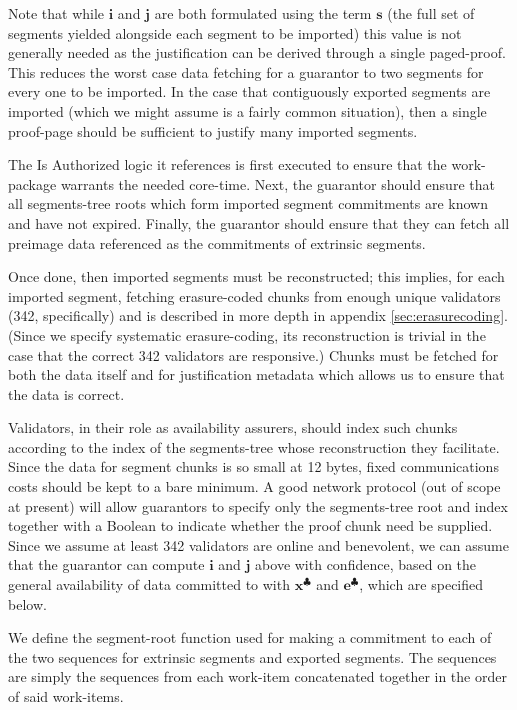 Note that while $\mathbf{i}$ and $\mathbf{j}$ are both formulated using the term $\mathbf{s}$ (the full set of segments yielded alongside each segment to be imported) this value is not generally needed as the justification can be derived through a single paged-proof. This reduces the worst case data fetching for a guarantor to two segments for every one to be imported. In the case that contiguously exported segments are imported (which we might assume is a fairly common situation), then a single proof-page should be sufficient to justify many imported segments.

The Is Authorized logic it references is first executed to ensure that the work-package warrants the needed core-time. Next, the guarantor should ensure that all segments-tree roots which form imported segment commitments are known and have not expired. Finally, the guarantor should ensure that they can fetch all preimage data referenced as the commitments of extrinsic segments.

Once done, then imported segments must be reconstructed; this implies, for each imported segment, fetching erasure-coded chunks from enough unique validators (342, specifically) and is described in more depth in appendix \ref{sec:erasurecoding}. (Since we specify systematic erasure-coding, its reconstruction is trivial in the case that the correct 342 validators are responsive.) Chunks must be fetched for both the data itself and for justification metadata which allows us to ensure that the data is correct.

Validators, in their role as availability assurers, should index such chunks according to the index of the segments-tree whose reconstruction they facilitate. Since the data for segment chunks is so small at 12 bytes, fixed communications costs should be kept to a bare minimum. A good network protocol (out of scope at present) will allow guarantors to specify only the segments-tree root and index together with a Boolean to indicate whether the proof chunk need be supplied. Since we assume at least 342 validators are online and benevolent, we can assume that the guarantor can compute $\mathbf{i}$ and $\mathbf{j}$ above with confidence, based on the general availability of data committed to with $\mathbf{x}^\clubsuit$ and $\mathbf{e}^\clubsuit$, which are specified below.


We define the segment-root function used for making a commitment to each of the two sequences for extrinsic segments and exported segments. The sequences are simply the sequences from each work-item concatenated together in the order of said work-items.

